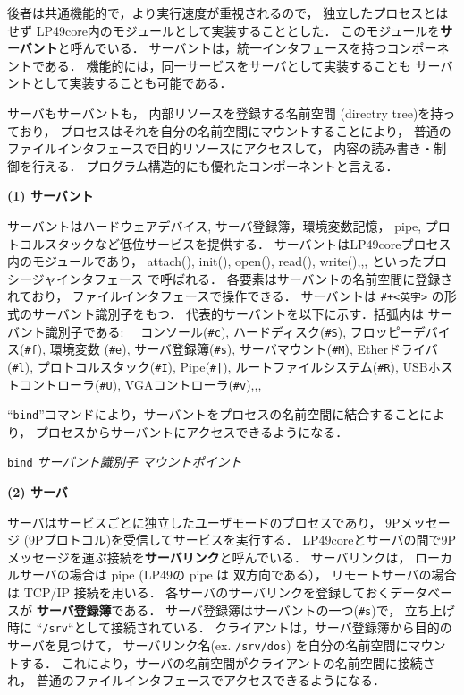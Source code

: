\documentclass{ieicej}
\begin{document}
  後者は共通機能的で，より実行速度が重視されるので，
  独立したプロセスとはせず LP49core内のモジュールとして実装することとした．
  このモジュールを{\bf サーバント}と呼んでいる．
  サーバントは，統一インタフェースを持つコンポーネントである．
  機能的には，同一サービスをサーバとして実装することも
  サーバントとして実装することも可能である．

   サーバもサーバントも，
   内部リソースを登録する名前空間 (directry tree)を持っており，
   プロセスはそれを自分の名前空間にマウントすることにより，
   普通のファイルインタフェースで目的リソースにアクセスして，
   内容の読み書き・制御を行える．
   プログラム構造的にも優れたコンポーネントと言える．

{\bf\flushleft (1) サーバント}

    サーバントはハードウェアデバイス, サーバ登録簿，環境変数記憶，
  pipe, プロトコルスタックなど低位サービスを提供する．
  サーバントはLP49coreプロセス内のモジュールであり，
  attach(), init(), open(), read(), write(),,, といったプロシージャインタフェース
  で呼ばれる．
%
  各要素はサーバントの名前空間に登録されており，
  ファイルインタフェースで操作できる．
  サーバントは \verb|#+<英字>| の形式のサーバント識別子をもつ．
  代表的サーバントを以下に示す．括弧内は サーバント識別子である:　
%
{\small
     コンソール(\verb|#c|), ハードディスク(\verb|#S|), フロッピーデバイス(\verb|#f|), 
     環境変数 (\verb|#e|), サーバ登録簿(\verb|#s|), サーバマウント(\verb|#M|), 
     Etherドライバ(\verb|#l|), 
     プロトコルスタック(\verb|#I|), Pipe(\verb$#|$), ルートファイルシステム(\verb|#R|), 
     USBホストコントローラ(\verb|#U|), VGAコントローラ(\verb|#v|),,,
}

``{\tt bind}''コマンドにより，サーバントをプロセスの名前空間に結合することにより，
プロセスからサーバントにアクセスできるようになる．

  {\tt bind}  {\em\small サーバント識別子}  {\em\small マウントポイント}  

{\bf\flushleft (2) サーバ}

  サーバはサービスごとに独立したユーザモードのプロセスであり，
  9Pメッセージ (9Pプロトコル)を受信してサービスを実行する．
  LP49coreとサーバの間で9Pメッセージを運ぶ接続を{\bf サーバリンク}と呼んでいる．
  サーバリンクは，
  ローカルサーバの場合は pipe (LP49の pipe は 双方向である），
  リモートサーバの場合は TCP/IP 接続を用いる．
%
  各サーバのサーバリンクを登録しておくデータベースが {\bf サーバ登録簿}である．
  サーバ登録簿はサーバントの一つ(\verb|#s|)で， 
  立ち上げ時に ``{\tt /srv}``として接続されている．
  クライアントは，サーバ登録簿から目的のサーバを見つけて，
  サーバリンク名(ex. {\tt /srv/dos}) を自分の名前空間にマウントする．
  これにより，サーバの名前空間がクライアントの名前空間に接続され，
  普通のファイルインタフェースでアクセスできるようになる．
\end{document}
